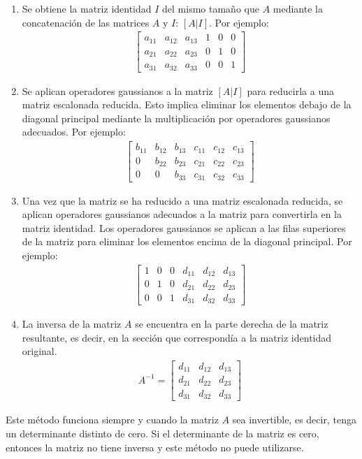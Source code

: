 \begin{enumerate}
    \item Se obtiene la matriz identidad $I$ del mismo tamaño que $A$ mediante la concatenación de las matrices $A$ y $I$: $[A|I]$. Por ejemplo: \\ \begin{align*}
        \left[ \begin{array}{rrr|rrr} a_{11} & a_{12} & a_{13} & 1 & 0 & 0 \\ a_{21} & a_{22} & a_{23} & 0 & 1 & 0 \\ a_{31} & a_{32} & a_{33} & 0 & 0 & 1 \end{array} \right]
    \end{align*}
    \item Se aplican operadores gaussianos a la matriz $[A|I]$ para reducirla a una matriz escalonada reducida. Esto implica eliminar los elementos debajo de la diagonal principal mediante la multiplicación por operadores gaussianos adecuados. Por ejemplo: \\ \begin{align*}
        \left[ \begin{array}{rrr|rrr} b_{11} & b_{12} & b_{13} & c_{11} & c_{12} & c_{13} \\ 0 & b_{22} & b_{23} & c_{21} & c_{22} & c_{23} \\ 0 & 0 & b_{33} & c_{31} & c_{32} & c_{33} \end{array} \right]
    \end{align*}
    \item Una vez que la matriz se ha reducido a una matriz escalonada reducida, se aplican operadores gaussianos adecuados a la matriz para convertirla en la matriz identidad. Los operadores gaussianos se aplican a las filas superiores de la matriz para eliminar los elementos encima de la diagonal principal. Por ejemplo: \\ \begin{align*}
        \left[ \begin{array}{rrr|rrr} 1 & 0 & 0 & d_{11} & d_{12} & d_{13} \\ 0 & 1 & 0 & d_{21} & d_{22} & d_{23} \\ 0 & 0 & 1 & d_{31} & d_{32} & d_{33} \end{array} \right]
    \end{align*}
    \item La inversa de la matriz $A$ se encuentra en la parte derecha de la matriz resultante, es decir, en la sección que correspondía a la matriz identidad original. \\ \begin{align*}
        A^{-1} = \left[ \begin{array}{rrr} d_{11} & d_{12} & d_{13} \\ d_{21} & d_{22} & d_{23} \\ d_{31} & d_{32} & d_{33} \end{array} \right]
    \end{align*}
\end{enumerate}

Este método funciona siempre y cuando la matriz $A$ sea invertible, es decir, tenga un determinante distinto de cero. Si el determinante de la matriz es cero, entonces la matriz no tiene inversa y este método no puede utilizarse.